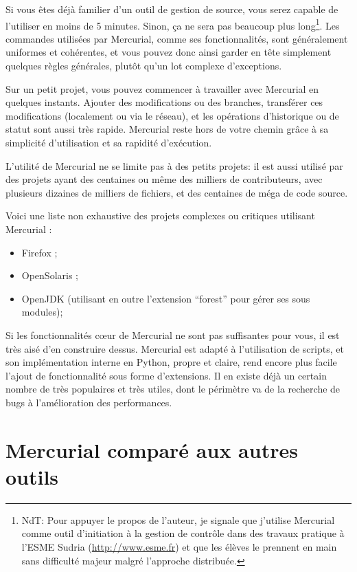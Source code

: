 Si vous êtes déjà familier d'un outil de gestion de source, vous serez
capable de l'utiliser en moins de 5 minutes. Sinon, ça ne sera pas beaucoup
plus long\footnote{NdT: Pour appuyer le propos de l'auteur, je signale que 
j'utilise Mercurial comme outil d'initiation à la gestion de contrôle dans
des travaux pratique à l'ESME Sudria (\url{http://www.esme.fr}) et que les
élèves le prennent en main sans difficulté majeur malgré l'approche distribuée.}. 
Les commandes utilisées par Mercurial, comme ses fonctionnalités, sont 
généralement uniformes et cohérentes, et vous pouvez donc ainsi garder en tête 
simplement quelques règles générales, plutôt qu'un lot complexe d'exceptions.

Sur un petit projet, vous pouvez commencer à travailler avec Mercurial en
quelques instants. Ajouter des modifications ou des branches, transférer 
ces modifications (localement ou via le réseau), et les opérations 
d'historique ou de statut sont aussi très rapide. Mercurial reste hors de 
votre chemin grâce à sa simplicité d'utilisation et sa rapidité d'exécution.

L'utilité de Mercurial ne se limite pas à des petits projets: il est 
aussi utilisé par des projets ayant des centaines ou même des milliers
de contributeurs, avec plusieurs dizaines de milliers de fichiers, et des
centaines de méga de code source.

Voici une liste non exhaustive des projets complexes ou critiques utilisant 
Mercurial :
\begin{itemize}
	\item Firefox ;
	\item OpenSolaris ;
	\item OpenJDK (utilisant en outre l'extension ``forest'' pour gérer
	ses sous modules);
\end{itemize}

Si les fonctionnalités cœur de Mercurial ne sont pas suffisantes pour vous, 
il est très aisé d'en construire dessus. Mercurial est adapté à l'utilisation
de scripts, et son implémentation interne en Python, propre et claire,
rend encore plus facile l'ajout de fonctionnalité sous forme d'extensions. Il
en existe déjà un certain nombre de très populaires et très utiles, 
dont le périmètre va de la recherche de bugs à l'amélioration des performances.

\section{Mercurial comparé aux autres outils}


